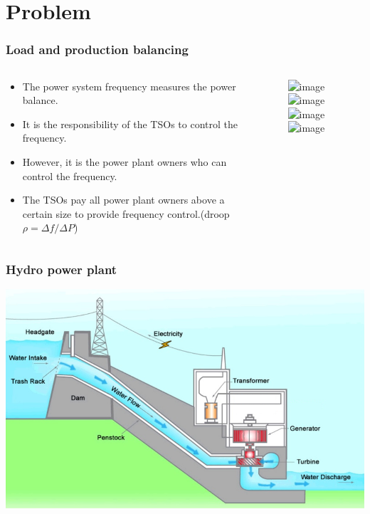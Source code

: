 \section{Problem}
\begin{frame}
	\frametitle{Load and production balancing}
	\begin{columns}
		\begin{column}{0.5\textwidth}
			\begin{itemize}
				\item<1-> The power system frequency measures the power balance.
				\item<2-> It is the responsibility of the TSOs to control the frequency.
				\item<3-> However, it is the power plant owners who can control the frequency.
				\item<4-> The TSOs pay all power plant owners above a certain size to provide frequency control.(droop $\rho =\Delta f/\Delta P$)
			\end{itemize}
		\end{column}
		\begin{column}{0.5\textwidth}
			\begin{figure}
				\includegraphics<1>[width=0.8\textwidth]{./pictures/balance.png}
				\includegraphics<2>[width=0.8\textwidth]{./pictures/balance_statnett.png}
				\includegraphics<3>[width=0.8\textwidth]{./pictures/balance_producers.png}
				\includegraphics<4>[width=0.9\textwidth]{./pictures/speedDroop.tikz}
			\end{figure}
		\end{column}
	\end{columns}
\end{frame}
\begin{frame}
	\frametitle{Hydro power plant}
	\includegraphics[width=\textwidth]{./pictures/power_plant.png}
\end{frame}
